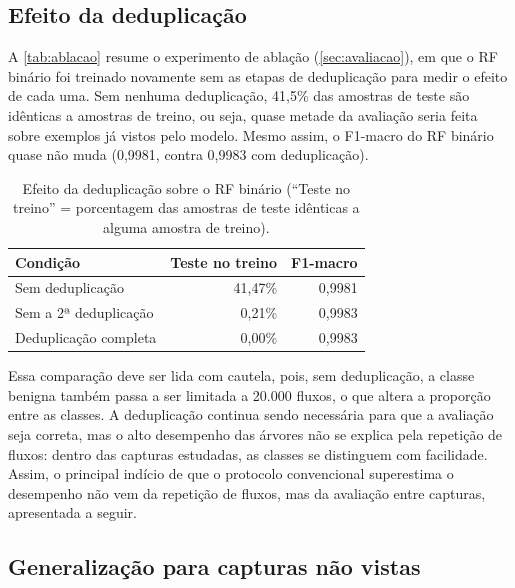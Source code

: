 \documentclass[alpha-refs,brazilian]{CC-EC_TF-TC}
\begin{document}
\subsection{Efeito da deduplicação}
\label{sec:res-dedup}

A \autoref{tab:ablacao} resume o experimento de ablação (\autoref{sec:avaliacao}), em que o RF binário foi treinado novamente sem as etapas de deduplicação para medir o efeito de cada uma. Sem nenhuma deduplicação, 41,5\% das amostras de teste são idênticas a amostras de treino, ou seja, quase metade da avaliação seria feita sobre exemplos já vistos pelo modelo. Mesmo assim, o F1-macro do RF binário quase não muda (0,9981, contra 0,9983 com deduplicação).

\begin{table}[htbp]
\centering
\caption{Efeito da deduplicação sobre o RF binário (``Teste no treino'' = porcentagem das amostras de teste idênticas a alguma amostra de treino).}
\label{tab:ablacao}
\small
\begin{tabular}{lrr}
\toprule
\textbf{Condição} & \textbf{Teste no treino} & \textbf{F1-macro} \\
\midrule
Sem deduplicação         & 41,47\% & 0,9981 \\
Sem a 2ª deduplicação    &  0,21\% & 0,9983 \\
Deduplicação completa    &  0,00\% & 0,9983 \\
\bottomrule
\end{tabular}
\end{table}

Essa comparação deve ser lida com cautela, pois, sem deduplicação, a classe benigna também passa a ser limitada a 20.000 fluxos, o que altera a proporção entre as classes. A deduplicação continua sendo necessária para que a avaliação seja correta, mas o alto desempenho das árvores não se explica pela repetição de fluxos: dentro das capturas estudadas, as classes se distinguem com facilidade. Assim, o principal indício de que o protocolo convencional superestima o desempenho não vem da repetição de fluxos, mas da avaliação entre capturas, apresentada a seguir.

\subsection{Generalização para capturas não vistas}
\label{sec:res-loso}
\end{document}
